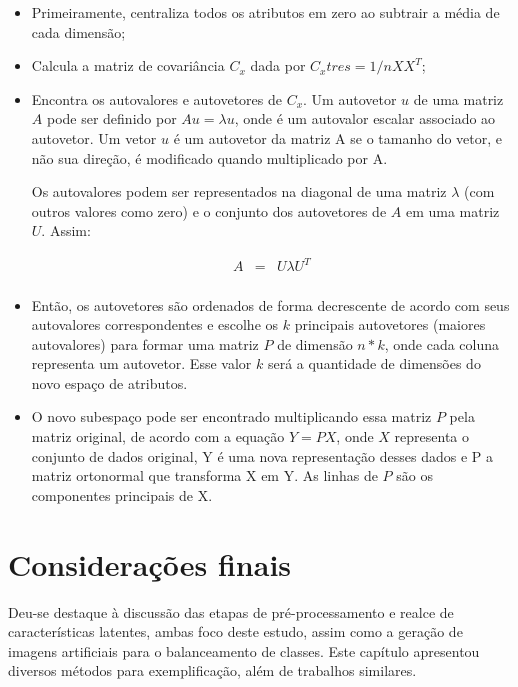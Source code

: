 \begin{itemize}
\item Primeiramente, centraliza todos os atributos em zero ao subtrair a média de cada dimensão;
\item Calcula a matriz de covariância $C_x$ dada por $C_x tres= 1/n X X^T$;
\item Encontra os autovalores e autovetores de $C_x$. Um autovetor $u$ de uma matriz $A$ pode ser definido por $Au = \lambda u$, onde \lambda é um autovalor escalar associado ao autovetor. Um vetor $u$ é um autovetor da matriz A se o tamanho do vetor, e não sua direção, é modificado quando multiplicado por A.

Os autovalores podem ser representados na diagonal de uma matriz $\lambda$ (com outros valores como zero) e o conjunto dos autovetores de $A$ em uma matriz $U$. Assim: \cite{Abdi2010}

\begin{eqnarray}
    A &=& U \lambda U^T \\
\end{eqnarray}

\item Então, os autovetores são ordenados de forma decrescente de acordo com seus autovalores correspondentes e escolhe os $k$ principais autovetores (maiores autovalores) para formar uma matriz $P$ de dimensão $n*k$, onde cada coluna representa um autovetor. Esse valor $k$ será a quantidade de dimensões do novo espaço de atributos.
\item O novo subespaço pode ser encontrado multiplicando essa matriz $P$ pela matriz original, de acordo com a equação $Y = PX$, onde $X$ representa o conjunto de dados original, Y é uma nova representação desses dados e P a matriz ortonormal que transforma X em Y. As linhas de $P$ são os componentes principais de X.
\end{itemize}

\section{Considerações finais}

Deu-se destaque à discussão das etapas de pré-processamento e realce de características latentes, ambas foco deste estudo, assim como a geração de imagens artificiais para o balanceamento de classes. Este capítulo apresentou diversos métodos para exemplificação, além de trabalhos similares.

